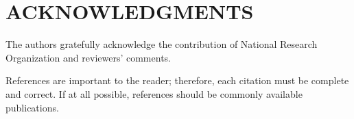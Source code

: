 \documentclass[letterpaper, 10 pt, conference]{ieeeconf}  %
\begin{document}
\section{ACKNOWLEDGMENTS}

The authors gratefully acknowledge the contribution of National Research Organization and reviewers' comments.



References are important to the reader; therefore, each citation must be complete and correct. If at all possible, references should be commonly available publications.



\appendix
\end{document}
